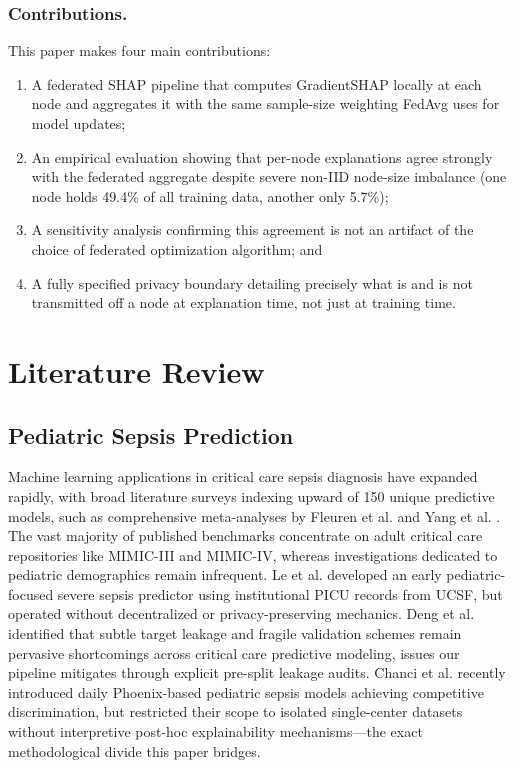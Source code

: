 \documentclass[runningheads]{llncs}
\begin{document}
\subsubsection{Contributions.} This paper makes four main contributions:
\begin{enumerate}
\item A federated SHAP pipeline that computes GradientSHAP locally at each node and aggregates it with the same sample-size weighting FedAvg uses for model updates;
\item An empirical evaluation showing that per-node explanations agree strongly with the federated aggregate despite severe non-IID node-size imbalance (one node holds 49.4\% of all training data, another only 5.7\%);
\item A sensitivity analysis confirming this agreement is not an artifact of the choice of federated optimization algorithm; and
\item A fully specified privacy boundary detailing precisely what is and is not transmitted off a node at explanation time, not just at training time.
\end{enumerate}

\section{Literature Review}\label{sec:litreview}

\subsection{Pediatric Sepsis Prediction}
Machine learning applications in critical care sepsis diagnosis have expanded rapidly, with broad literature surveys indexing upward of 150 unique predictive models, such as comprehensive meta-analyses by Fleuren et al. \cite{fleuren2020ml} and Yang et al. \cite{yang2023sepsis}. The vast majority of published benchmarks concentrate on adult critical care repositories like MIMIC-III and MIMIC-IV, whereas investigations dedicated to pediatric demographics remain infrequent. Le et al. \cite{le2019pediatric} developed an early pediatric-focused severe sepsis predictor using institutional PICU records from UCSF, but operated without decentralized or privacy-preserving mechanics. Deng et al. \cite{deng2022evaluating} identified that subtle target leakage and fragile validation schemes remain pervasive shortcomings across critical care predictive modeling, issues our pipeline mitigates through explicit pre-split leakage audits. Chanci et al. \cite{chanci2025machine} recently introduced daily Phoenix-based pediatric sepsis models achieving competitive discrimination, but restricted their scope to isolated single-center datasets without interpretive post-hoc explainability mechanisms---the exact methodological divide this paper bridges.
\end{document}
